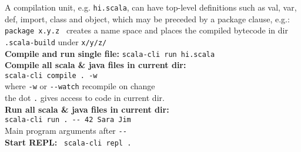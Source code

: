 \documentclass[article, a5paper]{memoir}
\newcommand{\code}{\lstinline[basicstyle=\ttfamily]}
\begin{document}
\hfill\begin{minipage}{0.40\linewidth}
\raggedright{\small\vspace{0.2em}
A compilation unit, e.g. \code{hi.scala}, can have top-level definitions such as val, var, def, import, class and object, which may be preceded by a package clause, e.g.: \code|package x.y.z | creates a name space and places the compiled bytecode in dir \code{.scala-build} under  \code{x/y/z/}\\[0.5em]

\textbf{Compile and run single file:}
\verb|scala-cli run hi.scala|\\[0.2em]
\textbf{Compile all scala \& java files in current dir:}\\
\verb|scala-cli compile . -w|\\
where \code{-w} or \code{--watch} recompile on change\\
the dot \code{.} gives access to code in current dir.
\\[0.2em]
\textbf{Run all scala \& java files in current dir:}\\
\verb|scala-cli run . -- 42 Sara Jim|\\Main program arguments after \code{--} 
\\[0.2em]
\textbf{Start REPL:} ~\verb|scala-cli repl .|\\[0.2em]
\hfill

}%
\end{minipage}
\end{document}
